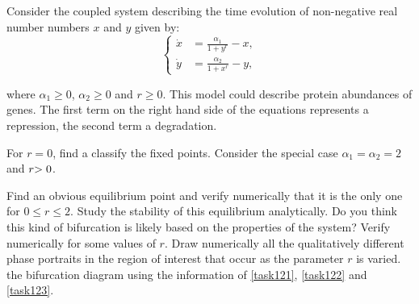 \begin{Exercise}[name=Gene control model]\label{EX12}

Consider the coupled system describing the time evolution of non-negative real number numbers $x$ and $y$ given by:
\begin{equation*}
\left\{
    \begin{aligned}
\dot{x} &= \frac{\alpha_1}{1+ y^r} - x, \\
\dot{y} &= \frac{\alpha_2}{1+ x^r} - y,
\end{aligned}
\right.
\end{equation*}


\noindent
where $\alpha_1 \geq 0$, $\alpha_2 \geq 0$ and $r \geq 0$. This model could describe protein abundances of genes. The first term on the right hand side of the equations represents a repression, the second term  a degradation. 

    \Question For  $r=0$, find a classify the fixed points. 
    \Question Consider the special case $\alpha_1 = \alpha_2 = 2$ and $r\textcolor{black}{>0}$.%
    \begin{tasks}%
        \task \label{task121}Find an obvious equilibrium point and verify numerically  that it is the only one for $0 \leq r \leq 2$.
        \task \label{task122}Study the stability of this equilibrium analytically. 
        \task \label{task123} %
        Do you think this kind of bifurcation is likely based on the properties of the system? Verify numerically for some values of $r$.
        \task Draw numerically all the qualitatively different phase portraits in the region of interest that occur as the parameter $r$ is varied.  the bifurcation diagram using the information of \ref{task121}, \ref{task122} and \ref{task123}.
    \end{tasks}

\end{Exercise}